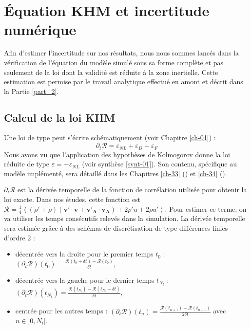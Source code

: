  \section{Équation KHM et incertitude numérique} 
 \label{sec-323}
 
 Afin d'estimer l'incertitude sur nos résultats, nous nous sommes lancés dans la vérification de l'équation  du modèle simulé sous sa forme complète et pas seulement de la loi  dont la validité est réduite à la zone inertielle. Cette estimation est permise par le travail analytique effectué en amont et décrit dans la Partie \ref{part_2}.
 
 \subsection{Calcul de la loi KHM}
 Une loi de type  peut s'écrire schématiquement (voir Chapitre \ref{ch-01}) : 
 \begin{equation}
  \label{eq:scheme_KHM_simu}   \partial_t \mathcal{R} =  \varepsilon_{NL} + \varepsilon_{D} + \varepsilon_{F}
 \end{equation}
 Nous avons vu que l'application des hypothèses de Kolmogorov donne la loi réduite de type  $\varepsilon = - \varepsilon_{NL}$ (voir synthèse \ref{synt-01}). Son contenu, spécifique au modèle implémenté, sera détaillé dans les Chapitres \ref{ch-33} () et \ref{ch-34} (). 
 
 $ \partial_t \mathcal{R}$ est la dérivée temporelle de la fonction de corrélation utilisée pour obtenir la loi exacte. Dans nos études, cette fonction est  $ \mathcal{R} =\frac{1}{4} \left< (\rho'+\rho) (\boldsymbol{v'} \cdot  \boldsymbol{v} +  \boldsymbol{v'_A} \cdot  \boldsymbol{v_A}) + 2\rho' u + 2 \rho u'\right>$. Pour estimer ce terme, on va utiliser les temps consécutifs relevés dans la simulation. La dérivée temporelle sera estimée grâce à des schémas de discrétisation de type \og différences finies \fg{} d'ordre 2 : 
 \begin{itemize}
     \item décentrée vers la droite pour le premier temps $t_0$ : $ (\partial_t \mathcal{R})(t_0) = \frac{\mathcal{R}(t_0 + \delta t) - \mathcal{R}(t_0)}{\delta t}$,
     \item décentrée vers la gauche pour le dernier temps $t_{N_t}$ : $ (\partial_t \mathcal{R})(t_{N_t}) = \frac{\mathcal{R}(t_{N_t}) - \mathcal{R}(t_{N_t}-\delta t)}{\delta t}$,
     \item centrée pour les autres temps :  $ (\partial_t \mathcal{R})(t_n) = \frac{\mathcal{R}(t_{n+1}) - \mathcal{R}(t_{n-1}) }{2\delta t}$ avec $n\in ]0,N_t[$.
 \end{itemize}
 
